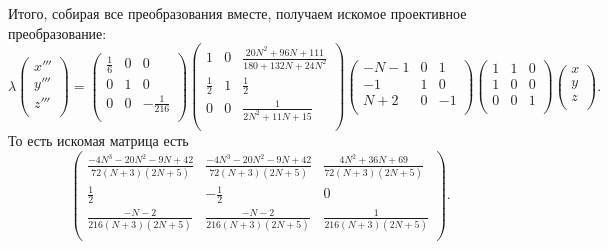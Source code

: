 \documentclass[a4paper,12pt]{article}
\theoremstyle{definition}
\begin{document}
    Итого, собирая все преобразования вместе, получаем искомое проективное
    преобразование:
    \[
        \lambda \begin{pmatrix}
            x''' \\
            y''' \\
            z''' \\
        \end{pmatrix} = 
        \begin{pmatrix}
            \frac{1}{6} & 0 & 0 \\
            0 & 1 & 0 \\
            0 & 0 & -\frac{1}{216} \\
        \end{pmatrix}
        \begin{pmatrix}
            1 & 0 & \frac{20 N^2 + 96 N + 111}{180 + 132 N + 24 N^2} \\
            \frac{1}{2} & 1 & \frac{1}{2} \\
            0 & 0 & \frac{1}{2 N^2 + 11 N + 15} \\
        \end{pmatrix}
        \begin{pmatrix}
            -N - 1 & 0 & 1 \\
            -1 & 1 & 0 \\
            N + 2 & 0 & -1 \\
        \end{pmatrix}
        \begin{pmatrix}
            1 & 1 & 0 \\
            1 & 0 & 0 \\
            0 & 0 & 1 \\
        \end{pmatrix}
        \begin{pmatrix}
            x \\
            y \\
            z \\
        \end{pmatrix}
    .\] 
    То есть искомая матрица есть
    \[
    \begin{pmatrix}
        \frac{-4 N^3 - 20 N^2 - 9 N + 42}{72 (N + 3) (2 N + 5)} &
        \frac{-4 N^3 - 20 N^2 - 9 N + 42}{72 (N + 3) (2 N + 5)} &
        \frac{4 N^2 + 36 N + 69}{72 (N + 3) (2 N + 5)} \\
        \frac{1}{2} &  -\frac{1}{2} & 0 \\
        \frac{-N - 2}{216 (N + 3) (2 N + 5)} & \frac{-N - 2}{216
        (N + 3) (2 N + 5)} & \frac{1}{216 (N + 3) (2 N + 5)} \\
    \end{pmatrix}
    .\] 
\end{document}
